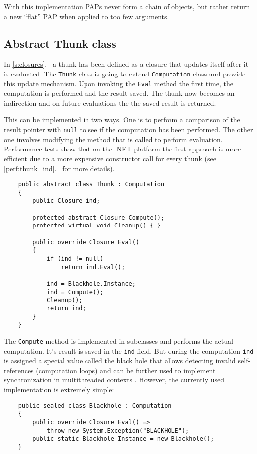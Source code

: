 \documentclass[en]{pracamgr}
\newcommand{\myref}[1]{\ref{#1}.~\nameref{#1}}
\begin{document}
With this implementation PAPs never form a chain of objects, but rather return a new ``flat'' PAP when applied to too few arguments.

\subsection{Abstract Thunk class}\label{s:thunk_class}

In \myref{s:closures} a thunk has been defined as a
closure that updates itself after it is evaluated.
The \texttt{Thunk} class is going to extend
\texttt{Computation} class and provide this update
mechanism. Upon invoking the \texttt{Eval} method the first
time, the computation is performed and the result saved.
The thunk now becomes an indirection and on future evaluations
the the saved result is returned.

This can be implemented in two ways. One is to perform a comparison
of the result pointer with \texttt{null} to see if
the computation has been performed.
The other one involves modifying the method that is called
to perform evaluation.
Performance tests show that on the .NET platform the first approach is more efficient
due to a more expensive constructor call for every thunk
(see \myref{perf:thunk_ind} for more details).

\newpage
\begin{verbatim}
    public abstract class Thunk : Computation
    {
        public Closure ind;

        protected abstract Closure Compute();
        protected virtual void Cleanup() { }
        
        public override Closure Eval()
        {
            if (ind != null) 
                return ind.Eval();

            ind = Blackhole.Instance;
            ind = Compute();
            Cleanup();
            return ind;
        }
    }
\end{verbatim}

The \texttt{Compute} method is implemented in subclasses
and performs the actual computation.
It's result is saved in the \texttt{ind} field.
But during the computation \texttt{ind} is assigned a special
value called the black hole that allows detecting
invalid self-references (computation loops) and can
be further used to implement synchronization in
multithreaded contexts \cite{multiprocessor}.
However, the currently used implementation is extremely simple:

\begin{verbatim}
    public sealed class Blackhole : Computation
    {
        public override Closure Eval() =>
            throw new System.Exception("BLACKHOLE");
        public static Blackhole Instance = new Blackhole();
    }
\end{verbatim}
\end{document}
